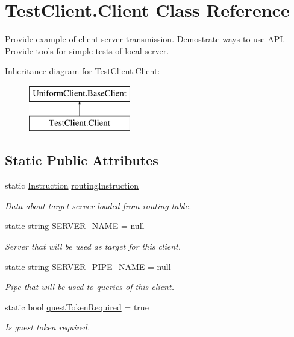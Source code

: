 \hypertarget{class_test_client_1_1_client}{}\section{Test\+Client.\+Client Class Reference}
\label{class_test_client_1_1_client}


Provide example of client-\/server transmission. Demostrate ways to use A\+PI. Provide tools for simple tests of local server.  


Inheritance diagram for Test\+Client.\+Client\+:\begin{figure}[H]
\begin{center}
\leavevmode
\includegraphics[height=2.000000cm]{d6/dac/class_test_client_1_1_client}
\end{center}
\end{figure}
\subsection*{Static Public Attributes}
\begin{DoxyCompactItemize}
\item 
static \mbox{\hyperlink{class_pipes_provider_1_1_networking_1_1_routing_1_1_instruction}{Instruction}} \mbox{\hyperlink{class_test_client_1_1_client_ac5365a862c09065db31123126239a7ee}{routing\+Instruction}}
\begin{DoxyCompactList}\small\item\em Data about target server loaded from routing table. \end{DoxyCompactList}\item 
static string \mbox{\hyperlink{class_test_client_1_1_client_a7fdac87931c97ce7fde6c4fc622bcfa6}{S\+E\+R\+V\+E\+R\+\_\+\+N\+A\+ME}} = null
\begin{DoxyCompactList}\small\item\em Server that will be used as target for this client. \end{DoxyCompactList}\item 
static string \mbox{\hyperlink{class_test_client_1_1_client_a58c70d565592caa15b99d9b145a133ea}{S\+E\+R\+V\+E\+R\+\_\+\+P\+I\+P\+E\+\_\+\+N\+A\+ME}} = null
\begin{DoxyCompactList}\small\item\em Pipe that will be used to queries of this client. \end{DoxyCompactList}\item 
static bool \mbox{\hyperlink{class_test_client_1_1_client_a1c9bf7696f11d779b1cea41f919fd3c5}{quest\+Token\+Required}} = true
\begin{DoxyCompactList}\small\item\em Is guest token required. \end{DoxyCompactList}\end{DoxyCompactItemize}
